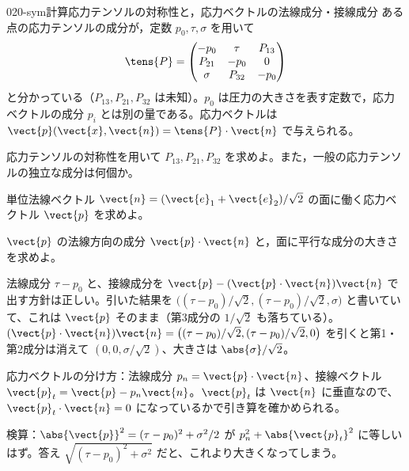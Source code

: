 \documentclass[uplatex,dvipdfmx,a4paper,11pt]{jsarticle}
\begin{document}
\begin{mondai}{020-sym}{計算}{応力テンソルの対称性と，応力ベクトルの法線成分・接線成分}
ある点の応力テンソルの成分が，定数 $p_0,\tau,\sigma$ を用いて
  \[ \tens{P}=\begin{pmatrix} -p_0 & \tau & P_{13}\\ P_{21} & -p_0 & 0\\ \sigma & P_{32} & -p_0 \end{pmatrix} \]
  と分かっている（$P_{13},P_{21},P_{32}$ は未知）。$p_0$ は圧力の大きさを表す定数で，応力ベクトルの成分 $p_i$ とは別の量である。応力ベクトルは $\vect{p}(\vect{x},\vect{n})=\tens{P}\cdot\vect{n}$ で与えられる。
  \begin{shoumon}
    \item 応力テンソルの対称性を用いて $P_{13},P_{21},P_{32}$ を求めよ。また，一般の応力テンソルの独立な成分は何個か。
    \item 単位法線ベクトル $\vect{n}=(\vect{e}_1+\vect{e}_2)/\sqrt{2}$ の面に働く応力ベクトル $\vect{p}$ を求めよ。
    \item $\vect{p}$ の法線方向の成分 $\vect{p}\cdot\vect{n}$ と，面に平行な成分の大きさを求めよ。
  \end{shoumon}

\begin{kotaeran}
   法線成分 $\tau-p_{0}$ と、接線成分を $\vect{p}-(\vect{p}\cdot\vect{n})\vect{n}$ で出す方針は正しい。引いた結果を $\bigl((\tau-p_{0})/\sqrt{2},(\tau-p_{0})/\sqrt{2},\sigma\bigr)$ と書いていて、これは $\vect{p}$ そのまま（第3成分の $1/\sqrt{2}$ も落ちている）。$(\vect{p}\cdot\vect{n})\vect{n}=\bigl((\tau-p_{0})/\sqrt{2},(\tau-p_{0})/\sqrt{2},0\bigr)$ を引くと第1・第2成分は消えて $(0,0,\sigma/\sqrt{2})$、大きさは $\abs{\sigma}/\sqrt{2}$。
\end{kotaeran}
\begin{rikai}
  \item 応力ベクトルの分け方：法線成分 $p_{n}=\vect{p}\cdot\vect{n}$、接線ベクトル $\vect{p}_{t}=\vect{p}-p_{n}\vect{n}$。$\vect{p}_{t}$ は $\vect{n}$ に垂直なので、$\vect{p}_{t}\cdot\vect{n}=0$ になっているかで引き算を確かめられる。
  \item 検算：$\abs{\vect{p}}^{2}=(\tau-p_{0})^{2}+\sigma^{2}/2$ が $p_{n}^{2}+\abs{\vect{p}_{t}}^{2}$ に等しいはず。答え $\sqrt{(\tau-p_{0})^{2}+\sigma^{2}}$ だと、これより大きくなってしまう。
\end{rikai}
\end{mondai}
\end{document}
